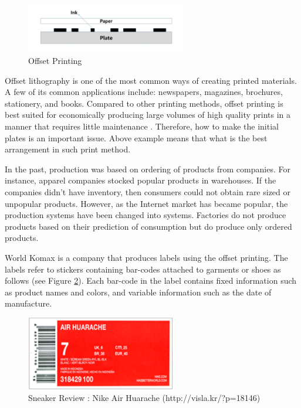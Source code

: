 \begin{figure}[h!]
	\centering
	\includegraphics[width=7cm]{OffsetPrint.pdf}
	\caption{Offset Printing}
	\label{fig:OffsetPrint}
\end{figure}

Offset lithography is one of the most common ways of creating printed materials. A few of its common applications include: newspapers, magazines, brochures, stationery, and books. Compared to other printing methods, offset printing is best suited for economically producing large volumes of high quality prints in a manner that requires little maintenance \cite{Kipphan2001}. Therefore, how to make the initial plates is an important issue. Above example means that what is the best arrangement in such print method.

In the past, production was based on ordering of products from companies. For instance, apparel companies stocked popular products in warehouses. If the companies didn't have inventory, then consumers could not obtain rare sized or unpopular products. However, as the Internet market has became popular, the production systems have been changed into systems. Factories do not produce products based on their prediction of consumption but do produce only ordered products.

World Komax is a company that produces labels using the offset printing. The labels refer to stickers containing bar-codes attached to garments or shoes as follows (see Figure \ref{fig:AirHuarache}). Each bar-code in the label contains fixed information such as product names and colors, and variable information such as the date of manufacture.

\begin{figure}[h!]
	\centering
	\includegraphics[width=6.5cm]{AirHuarache.pdf}
	\caption{Sneaker Review : Nike Air Huarache (http://visla.kr/?p=18146)}
	\label{fig:AirHuarache}       %
\end{figure}

